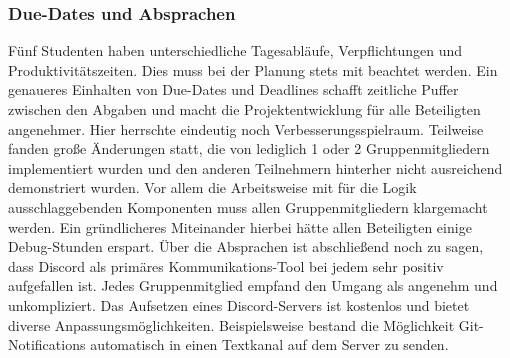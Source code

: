 \subsubsection{Due-Dates und Absprachen}
Fünf Studenten haben unterschiedliche Tagesabläufe, Verpflichtungen und Produktivitätszeiten.
Dies muss bei der Planung stets mit beachtet werden.
Ein genaueres Einhalten von Due-Dates und Deadlines schafft zeitliche Puffer zwischen den Abgaben
und macht die Projektentwicklung für alle Beteiligten angenehmer.
Hier herrschte eindeutig noch Verbesserungsspielraum.
Teilweise fanden große Änderungen statt, die von lediglich 1 oder 2 Gruppenmitgliedern
implementiert wurden und den anderen Teilnehmern hinterher nicht ausreichend demonstriert wurden.
Vor allem die Arbeitsweise mit für die Logik ausschlaggebenden Komponenten muss allen
Gruppenmitgliedern klargemacht werden.
Ein gründlicheres Miteinander hierbei hätte allen Beteiligten einige Debug-Stunden erspart.
Über die Absprachen ist abschließend noch zu sagen, dass Discord
als primäres Kommunikations-Tool bei jedem sehr positiv aufgefallen ist.
Jedes Gruppenmitglied empfand den Umgang als angenehm und unkompliziert.
Das Aufsetzen eines Discord-Servers ist kostenlos und bietet diverse Anpassungsmöglichkeiten.
Beispielsweise bestand die Möglichkeit Git-Notifications automatisch in einen
Textkanal auf dem Server zu senden.

\subsubsection{}